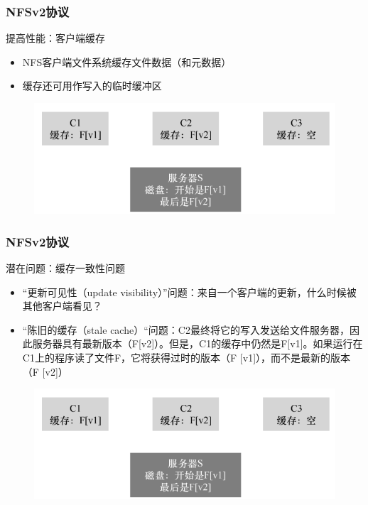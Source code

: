 \begin{frame}[fragile]
    \frametitle{NFSv2协议}
    提高性能：客户端缓存
    
    \begin{itemize}
        \item NFS客户端文件系统缓存文件数据（和元数据）
        \item 缓存还可用作写入的临时缓冲区
    \end{itemize}

        \begin{figure}
            \includegraphics[width=0.7\linewidth]{figs/nfsv2-cache.png}
        \end{figure}
    
\end{frame}

\begin{frame}[fragile]
    \frametitle{NFSv2协议}
    潜在问题：缓存一致性问题
    
    \begin{itemize}
        \item “更新可见性（update visibility）”问题：来自一个客户端的更新，什么时候被其他客户端看见？\pause
        \item “陈旧的缓存（stale cache）“问题：C2最终将它的写入发送给文件服务器，因此服务器具有最新版本（F[v2]）。但是，C1的缓存中仍然是F[v1]。如果运行在C1上的程序读了文件F，它将获得过时的版本（F [v1]），而不是最新的版本（F [v2]）
    \end{itemize}
    
    \begin{figure}
        \includegraphics[width=0.5\linewidth]{figs/nfsv2-cache.png}
    \end{figure}
    
\end{frame}


